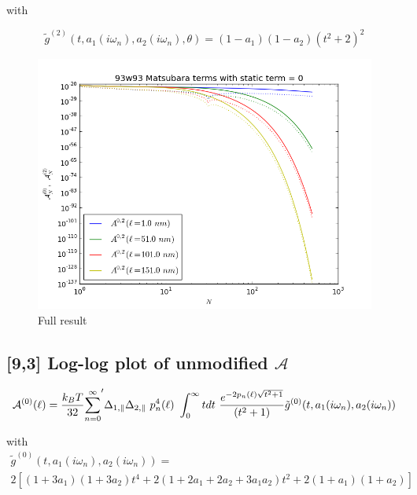 \documentclass[a4paper]{article}
\begin{document}
\begin{center}
with

\begin{equation}
\tilde g^{(2)}(t, a_1(i \omega_n), a_2(i \omega_n), \theta) = (1-a_1)(1-a_2)(t^{2} + 2)^2
\label{befgqw}
\end{equation}

\begin{figure}[t!]
\begin{center}
\includegraphics[width=1.0\textwidth]{plots/93_n0_A_vs_n.png}
\hskip 43pt
\caption{Full result}
\label{eiz65}
\end{center}
\end{figure} 

\subsection{[9,3] Log-log plot of unmodified $\mathcal{A}$ }
\begin{equation}
{\cal A}^{(0)}(\ell) = \frac{k_BT}{32}  {\sum_{n=0}^{\infty}}' \Delta_{1,\parallel} \Delta_{2,\parallel} ~p_n^{4}(\ell) ~\int_0^{\infty} t dt ~\frac{e^{- 2 p_n(\ell) \sqrt{t^{2} + 1}}}{(t^{2} + 1)} \tilde g^{(0)}(t, a_1(i \omega_n), a_2(i \omega_n))
\end{equation}

with
\begin{multline*}
\tilde g^{(0)}(t, a_1(i \omega_n), a_2(i \omega_n)) = \\ 
2 \left[ (1+3a_1)(1+3a_2) t^{4} + 2 (1+2a_1+2a_2+3a_1a_2) t^{2}  + 2(1+a_1)(1+a_2)\right]
\end{multline*}



\end{center}
\end{document}
